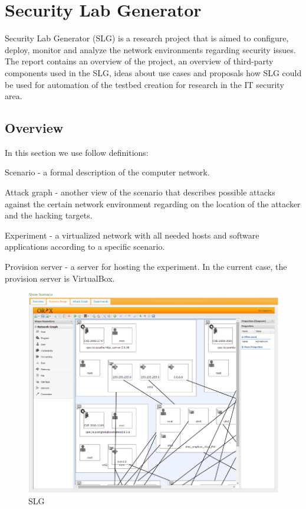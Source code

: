 %


\section{Security Lab Generator}
Security Lab Generator (SLG) is a research project that is aimed to configure, deploy, monitor and analyze the network environments regarding security issues. The report contains an overview of the project, an overview of third-party components used in the SLG, ideas about use cases and proposals how SLG could be used for automation of the testbed creation for research in the IT security area.

\subsection{Overview}

In this section we use follow definitions:
\begin{compactitem}
\item Scenario - a formal description of the computer network. 
\item Attack graph - another view of the scenario that describes possible attacks against the certain network environment regarding on the location of the attacker and the hacking targets.   
\item Experiment - a virtualized network with all needed hosts and software applications according to a specific scenario.
\item Provision server - a server for hosting the experiment. In the current case, the provision server is VirtualBox.
\end{compactitem}

\begin{figure}[ht!]
\centering
\includegraphics[width=\textwidth]{slg.png}
\caption{SLG}
\label{overflow}
\end{figure} 

